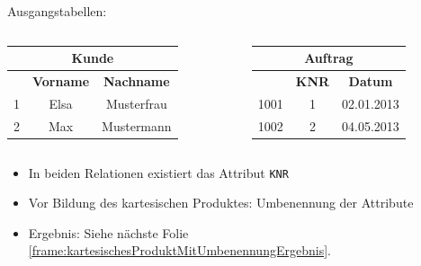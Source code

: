 \begin{frame}
\frametitle{\insertsection}
\framesubtitle{\insertsubsection}
\onslide
{}
\abs
Ausgangstabellen:
\begin{columns}
	\begin{column}{.48\textwidth}
		\begin{center}
			\begin{tabular}{|c|c|c|}\hline
				\multicolumn{3}{|c|}{\footnotesize \textbf{Kunde}}\\\hline\hline
				\footnotesize \textbf{\key{KNR}} & \footnotesize \textbf{Vorname} & \footnotesize \textbf{Nachname}  \\\hline
				\footnotesize 1 &\footnotesize Elsa &\footnotesize Musterfrau \\\hline
				\footnotesize 2 & \footnotesize Max &\footnotesize  Mustermann  \\\hline
			\end{tabular}
		\end{center}
	\end{column}
	\begin{column}{.48\textwidth}
		\begin{center}
			\begin{tabular}{|c|c|c|}\hline
				\multicolumn{3}{|c|}{\footnotesize \textbf{Auftrag}}\\\hline\hline
				\footnotesize \textbf{\key{ANR}} & \footnotesize \textbf{KNR}&\footnotesize \textbf{Datum}  \\\hline
				\footnotesize 1001 &\footnotesize 1 &\footnotesize 02.01.2013 \\\hline
				\footnotesize 1002 & \footnotesize 2& \footnotesize  04.05.2013  \\\hline
			\end{tabular}
		\end{center}
	\end{column}
\end{columns}
\abs
\pause
\begin{itemize}
	\item In beiden Relationen existiert das Attribut \texttt{KNR}
	\item Vor Bildung des kartesischen Produktes: Umbenennung der Attribute
	\item Ergebnis: Siehe n\"achste Folie \ref{frame:kartesischesProduktMitUmbenennungErgebnis}.
\end{itemize}
\end{frame}

